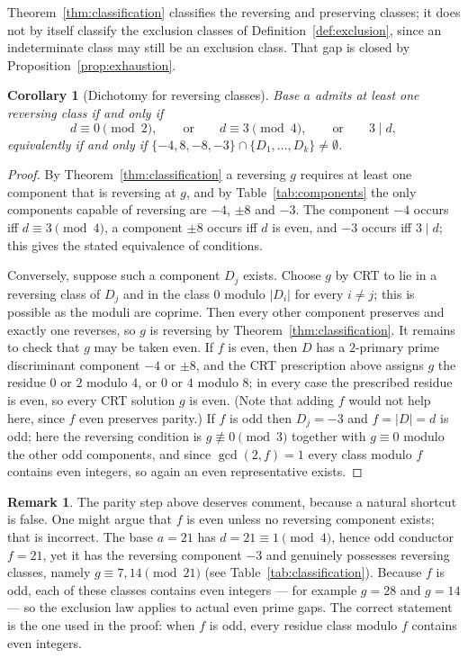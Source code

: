 \documentclass[11pt,reqno]{amsart}
\theoremstyle{plain}
\newtheorem{corollary}[theorem]{Corollary}
\theoremstyle{definition}
\newtheorem{remark}[theorem]{Remark}
\begin{document}
Theorem~\ref{thm:classification} classifies the reversing and preserving
classes; it does not by itself classify the exclusion classes of
Definition~\ref{def:exclusion}, since an indeterminate class may still be an
exclusion class. That gap is closed by Proposition~\ref{prop:exhaustion}.

\begin{corollary}[Dichotomy for reversing classes]
\label{cor:dichotomy}
Base $a$ admits at least one \emph{reversing} class if and only if
\[
  d \equiv 0 \!\!\pmod 2, \qquad\text{or}\qquad d \equiv 3 \!\!\pmod 4,
  \qquad\text{or}\qquad 3 \mid d,
\]
equivalently if and only if $\{-4, 8, -8, -3\} \cap \{D_1, \dots, D_k\} \neq
\emptyset$.
\end{corollary}

\begin{proof}
By Theorem~\ref{thm:classification} a reversing $g$ requires at least one
component that is reversing at $g$, and by Table~\ref{tab:components} the only
components capable of reversing are $-4$, $\pm 8$ and $-3$. The component $-4$
occurs iff $d \equiv 3 \pmod 4$, a component $\pm 8$ occurs iff $d$ is even,
and $-3$ occurs iff $3 \mid d$; this gives the stated equivalence of
conditions.

Conversely, suppose such a component $D_j$ exists. Choose $g$ by CRT to lie in
a reversing class of $D_j$ and in the class $0$ modulo $|D_i|$ for every
$i \neq j$; this is possible as the moduli are coprime. Then every other
component preserves and exactly one reverses, so $g$ is reversing by
Theorem~\ref{thm:classification}. It remains to check that $g$ may be taken
even. If $f$ is even, then $D$ has a $2$-primary prime discriminant component
$-4$ or $\pm 8$, and the CRT prescription above assigns $g$ the residue $0$ or
$2$ modulo $4$, or $0$ or $4$ modulo $8$; in every case the prescribed residue
is even, so every CRT solution $g$ is even. (Note that adding $f$ would not
help here, since $f$ even preserves parity.) If $f$ is odd then $D_j = -3$ and $f = |D| = d$ is odd; here the reversing condition is
$g \not\equiv 0 \pmod 3$ together with $g \equiv 0$ modulo the other odd
components, and since $\gcd(2, f) = 1$ every class modulo $f$ contains even
integers, so again an even representative exists.
\end{proof}

\begin{remark}
\label{rem:parity}
The parity step above deserves comment, because a natural shortcut is false.
One might argue that $f$ is even unless no reversing component exists; that is
incorrect. The base $a = 21$ has $d = 21 \equiv 1 \pmod 4$, hence odd conductor
$f = 21$, yet it has the reversing component $-3$ and genuinely possesses
reversing classes, namely $g \equiv 7, 14 \pmod{21}$ (see
Table~\ref{tab:classification}). Because $f$ is odd, each of these classes
contains even integers --- for example $g = 28$ and $g = 14$ --- so the
exclusion law applies to actual even prime gaps. The correct statement is the
one used in the proof: when $f$ is odd, every residue class modulo $f$ contains
even integers.
\end{remark}
\end{document}
